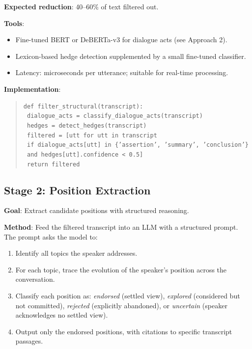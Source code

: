 \documentclass[11pt,letterpaper]{article}
\begin{document}
\textbf{Expected reduction}: 40–60\% of text filtered out.

\textbf{Tools}:
\begin{itemize}
  \item Fine-tuned BERT or DeBERTa-v3 for dialogue acts (see Approach 2).
  \item Lexicon-based hedge detection supplemented by a small fine-tuned classifier.
  \item Latency: microseconds per utterance; suitable for real-time processing.
\end{itemize}

\textbf{Implementation}:

\begin{quote}
\texttt{def filter\_structural(transcript):}\\
\texttt{  dialogue\_acts = classify\_dialogue\_acts(transcript)}\\
\texttt{  hedges = detect\_hedges(transcript)}\\
\texttt{  filtered = [utt for utt in transcript}\\
\texttt{    if dialogue\_acts[utt] in \{'assertion', 'summary', 'conclusion'\}}\\
\texttt{    and hedges[utt].confidence < 0.5]}\\
\texttt{  return filtered}
\end{quote}

\subsection{Stage 2: Position Extraction}

\textbf{Goal}: Extract candidate positions with structured reasoning.

\textbf{Method}: Feed the filtered transcript into an LLM with a structured prompt. The prompt asks the model to:

\begin{enumerate}
  \item Identify all topics the speaker addresses.
  \item For each topic, trace the evolution of the speaker's position across the conversation.
  \item Classify each position as: \textit{endorsed} (settled view), \textit{explored} (considered but not committed), \textit{rejected} (explicitly abandoned), or \textit{uncertain} (speaker acknowledges no settled view).
  \item Output only the endorsed positions, with citations to specific transcript passages.
\end{enumerate}
\end{document}
